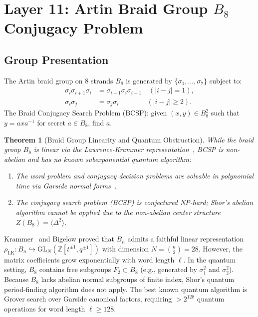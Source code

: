 \documentclass{ieeeaccess}
\newcommand{\Z}{\mathbb{Z}}
\newtheorem{theorem}{Theorem}
\newenvironment{proof}{\begin{IEEEproof}\IEEEQEDoff}{\end{IEEEproof}}
\begin{document}
\section{Layer 11: Artin Braid Group $B_8$ Conjugacy Problem}
\label{sec:L11}

\subsection{Group Presentation}
The Artin braid group on 8 strands $B_8$ is generated by $\{\sigma_1, \dots, \sigma_7\}$ subject to:
\begin{equation}
\begin{aligned}
  \sigma_i \sigma_{i+1} \sigma_i &= \sigma_{i+1} \sigma_i \sigma_{i+1} \quad (|i-j|=1), \\
  \sigma_i \sigma_j &= \sigma_j \sigma_i \quad\quad\quad\quad (|i-j| \geq 2).
\end{aligned}
\label{eq:braid-relations}
\end{equation}
The Braid Conjugacy Search Problem (BCSP): given $(x, y) \in B_8^2$ such that $y = a x a^{-1}$ for secret $a \in B_8$, find $a$.

\begin{theorem}[Braid Group Linearity and Quantum Obstruction]
\label{thm:L11-braid}
While the braid group $B_8$ is linear via the Lawrence-Krammer representation~\cite{Krammer2002}, BCSP is non-abelian and has no known subexponential quantum algorithm:
\begin{enumerate}
  \item The word problem and conjugacy decision problems are solvable in polynomial time via Garside normal forms~\cite{Dehornoy2004}.
  \item The conjugacy search problem (BCSP) is conjectured NP-hard; Shor's abelian algorithm cannot be applied due to the non-abelian center structure $Z(B_8) = \langle \Delta^2 \rangle$.
\end{enumerate}
\end{theorem}
\begin{proof}
Krammer~\cite{Krammer2002} and Bigelow proved that $B_n$ admits a faithful linear representation $\rho_{\mathrm{LK}} : B_n \hookrightarrow \mathrm{GL}_N(\Z[t^{\pm 1}, q^{\pm 1}])$ with dimension $N = \binom{n}{2} = 28$.
However, the matrix coefficients grow exponentially with word length $\ell$.
In the quantum setting, $B_8$ contains free subgroups $F_2 \subset B_8$ (e.g., generated by $\sigma_1^2$ and $\sigma_2^2$).
Because $B_8$ lacks abelian normal subgroups of finite index, Shor's quantum period-finding algorithm does not apply.
The best known quantum algorithm is Grover search over Garside canonical factors, requiring $> 2^{128}$ quantum operations for word length $\ell \geq 128$.
\end{proof}
\end{document}
